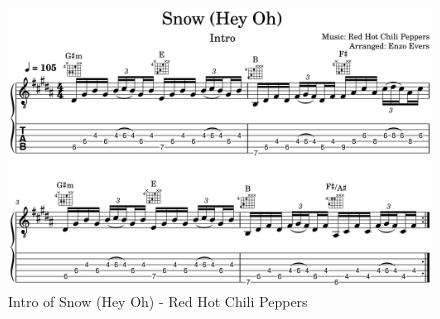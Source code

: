 \begin{figure}[h]
	\centering
	\includegraphics[width=\textwidth]{../../MuseScore/Guitar/Snow_RHCP_Intro.png}
	\caption{Intro of Snow (Hey Oh) - Red Hot Chili Peppers}
	\label{fig:guitar_snow_rhcp_intro}
\end{figure}